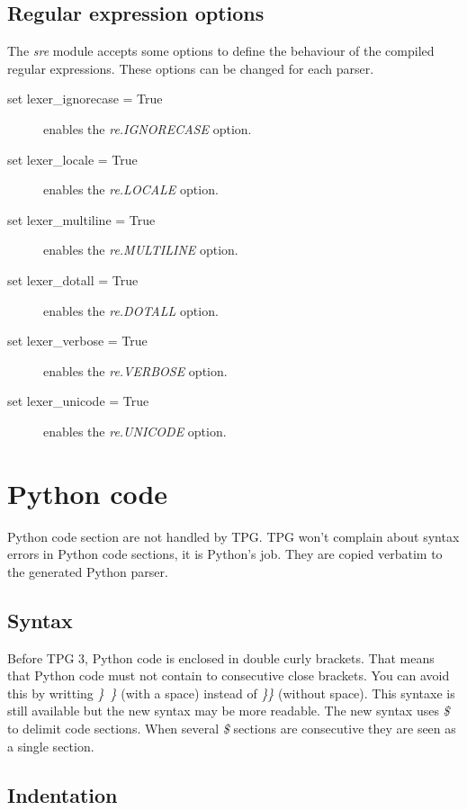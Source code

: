 \subsection{Regular expression options}

The \emph{sre} module accepts some options to define the behaviour of the compiled regular expressions.
These options can be changed for each parser.

\begin{description}
    \item [set lexer\_ignorecase = True] enables the \emph{re.IGNORECASE} option.
    \item [set lexer\_locale = True] enables the \emph{re.LOCALE} option.
    \item [set lexer\_multiline = True] enables the \emph{re.MULTILINE} option.
    \item [set lexer\_dotall = True] enables the \emph{re.DOTALL} option.
    \item [set lexer\_verbose = True] enables the \emph{re.VERBOSE} option.
    \item [set lexer\_unicode = True] enables the \emph{re.UNICODE} option.
\end{description}

\section{Python code}                                       \label{grammar:code}

Python code section are not handled by TPG.
TPG won't complain about syntax errors in Python code sections, it is Python's job.
They are copied verbatim to the generated Python parser.

\subsection{Syntax}

Before TPG 3, Python code is enclosed in double curly brackets.
That means that Python code must not contain to consecutive close brackets.
You can avoid this by writting \emph{\}~\}} (with a space) instead of \emph{\}\}} (without space).
This syntaxe is still available but the new syntax may be more readable.
The new syntax uses \emph{\$} to delimit code sections.
When several \emph{\$} sections are consecutive they are seen as a single section.

\subsection{Indentation}

